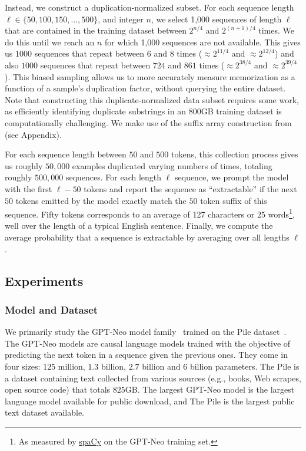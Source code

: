 Instead, we construct a duplication-normalized subset.
%
For each sequence length $\ell \in \{50,100,150,\dots,500\}$,
and integer $n$,
we select 1,000 sequences of length $\ell$ that are contained in the training dataset between $2^{n/4}$ and $2^{(n+1)/4}$ times.
We do this until we reach an $n$ for which 1,000 sequences are not available.
%
This gives us $1000$ sequences that repeat between $6$ and $8$ times ($\approx 2^{11/4}$ and $\approx 2^{12/4}$) and also $1000$ sequences that repeat between $724$ and $861$ times ($\approx 2^{38/4}$ and $\approx 2^{39/4}$).
%
This biased sampling allows us to more accurately measure memorization as a function of a sample's duplication factor, without querying the entire dataset.
%
Note that constructing this duplicate-normalized data subset requires some work,
as efficiently identifying duplicate substrings in an $800$GB training dataset is
computationally challenging.
%
We make use of the suffix array construction from \citet{2021dedup} (see Appendix).

For each sequence length between $50$ and $500$ tokens, this collection process gives us roughly $50,000$ examples duplicated varying numbers
of times,
totaling roughly $500{,}000$ sequences.
%
For each length $\ell$ sequence, we prompt the model with the first $\ell-50$ tokens and report the sequence
as ``extractable'' if the next $50$ tokens emitted by the model exactly match the $50$ token suffix of this sequence.
Fifty tokens corresponds to an average of 127 characters or 25 words\footnote{As measured by \href{https://spacy.io/}{spaCy} on the GPT-Neo training set.}, well over the length of a typical English sentence.
%
Finally, we compute the average probability that a sequence is extractable by averaging over all lengths $\ell$.


\subsection{Experiments}

\subsubsection{Model and Dataset}
We primarily study the GPT-Neo model family~\citep{gpt-neo,gpt-j} trained on the Pile dataset~\citep{gao2020pile}.
The GPT-Neo models are causal language models 
trained with the objective of predicting the next token in a sequence given the previous ones.
They come in four sizes: $125$ million, $1.3$ billion, $2.7$ billion and $6$ billion parameters. 
The Pile is a dataset containing text collected from various sources (e.g., books, Web scrapes, open source code) that totals $825$GB.
%
The largest GPT-Neo model is the largest language model available for public download, and The Pile is the largest public text dataset available.

